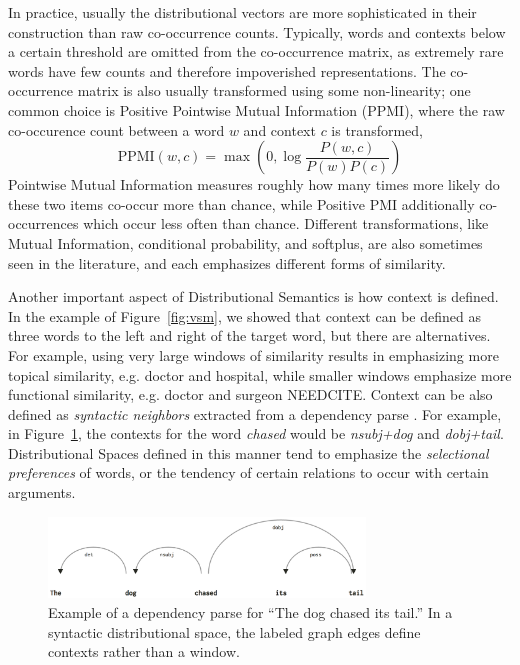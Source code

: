 \documentclass[letterpaper]{article}
\begin{document}
In practice, usually the distributional vectors are more sophisticated in their
construction than raw co-occurrence counts. Typically, words and contexts below
a certain threshold are omitted from the co-occurrence matrix, as extremely
rare words have few counts and therefore impoverished representations. The
co-occurrence matrix is also usually transformed using some non-linearity;
one common choice is Positive Pointwise Mutual Information (PPMI), where the
raw co-occurence count between a word $w$ and context $c$ is transformed,
\begin{equation*}
  \text{PPMI}(w, c) = \max\left(0, \log\frac{P(w, c)}{P(w)P(c)}\right)
\end{equation*}
Pointwise Mutual Information measures roughly how many times more likely
do these two items co-occur more than chance, while Positive PMI additionally
co-occurrences which occur less often than chance. Different transformations,
like Mutual Information, conditional probability, and softplus, are also
sometimes seen in the literature, and each emphasizes different forms of
similarity.

Another important aspect of Distributional Semantics is how context is defined.
In the example of Figure~\ref{fig:vsm}, we showed that context can be defined
as three words to the left and right of the target word, but there are
alternatives. For example, using very large windows of similarity results in
emphasizing more topical similarity, e.g. doctor and hospital, while smaller
windows emphasize more functional similarity, e.g. doctor and surgeon NEEDCITE.
Context can be also defined as {\em syntactic neighbors} extracted
from a dependency parse \cite{pado:2007:cl}. For example, in Figure~\ref{fig:syn},
the contexts for the word {\em chased} would be {\em nsubj+dog} and {\em
dobj+tail}. Distributional Spaces defined in this manner tend to emphasize
the {\em selectional preferences} of words, or the tendency of certain
relations to occur with certain arguments.

\begin{figure}
  \centering
  \includegraphics[width=0.75\textwidth]{figures/syn}
\caption{Example of a dependency parse for ``The dog chased its tail.'' In
a syntactic distributional space, the labeled graph edges define contexts
rather than a window.}
\label{fig:syn}
\end{figure}
\end{document}
